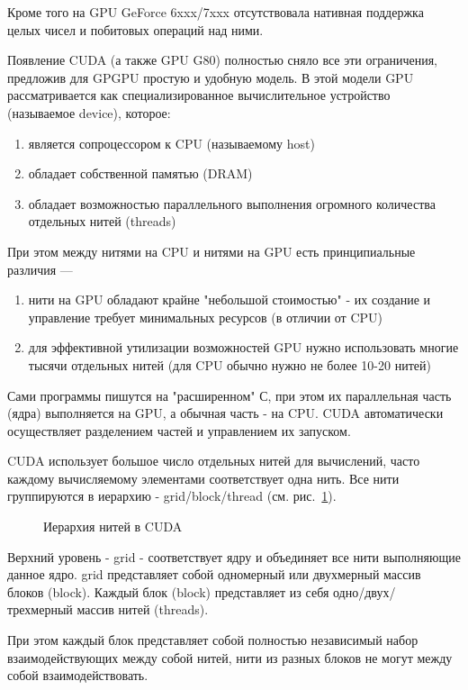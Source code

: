 Кроме того на GPU GeForce 6xxx/7xxx отсутствовала нативная поддержка целых чисел и побитовых операций над ними.

Появление CUDA (а также GPU G80) полностью сняло все эти ограничения, предложив для GPGPU простую и удобную модель. В этой модели GPU рассматривается как специализированное вычислительное устройство (называемое device), которое:
\begin{enumerate}
\item является сопроцессором к CPU (называемому host)
\item обладает собственной памятью (DRAM)
\item обладает возможностью параллельного выполнения огромного количества отдельных нитей (threads)
\end{enumerate}

При этом между нитями на CPU и нитями на GPU есть принципиальные различия ---
\begin{enumerate}
\item нити на GPU обладают крайне "небольшой стоимостью" - их создание и управление требует минимальных ресурсов (в отличии от CPU)
\item для эффективной утилизации возможностей GPU нужно использовать многие тысячи отдельных нитей (для CPU обычно нужно не более 10-20 нитей)
\end{enumerate}

Сами программы пишутся на "расширенном" С, при этом их параллельная часть (ядра) выполняется на GPU, а обычная часть - на CPU. CUDA автоматически осуществляет разделением частей и управлением их запуском.

CUDA использует большое число отдельных нитей для вычислений, часто каждому вычисляемому элементами соответствует одна нить. Все нити группируются в иерархию - grid/block/thread (см. рис.~\ref{cuda-1}).
\begin{figure}[h]
\caption{Иерархия нитей в CUDA}
\label{cuda-1}
\end{figure}

Верхний уровень - grid - соответствует ядру и объединяет все нити выполняющие данное ядро. grid представляет собой одномерный или двухмерный массив блоков (block). Каждый блок (block) представляет из себя одно/двух/трехмерный массив нитей (threads).

При этом каждый блок представляет собой полностью независимый набор взаимодействующих между собой нитей, нити из разных блоков не могут между собой взаимодействовать.

